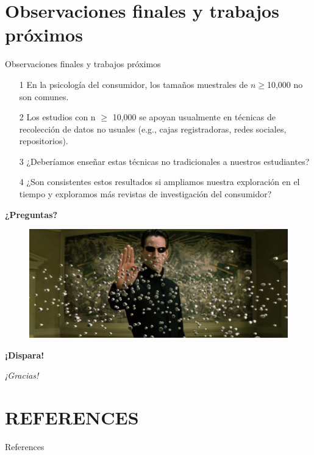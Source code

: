 \documentclass{beamer}
\begin{document}
\section{Observaciones finales y trabajos próximos}
\begin{frame}{Observaciones finales y trabajos próximos}
\begin{itemize}
    \item[1] En la psicología del consumidor, los tamaños muestrales de $n \geq$10,000 no son comunes.
    \pause
    \vspace{0.5 cm}
    \item[2] Los estudios con n $\geq$ 10,000 se apoyan usualmente en técnicas de recolección de datos no usuales (e.g., cajas registradoras, redes sociales, repositorios).
    \pause
    \vspace{0.5 cm}
    \item[3] ¿Deberíamos enseñar estas técnicas no tradicionales a nuestros estudiantes?
    \pause
    \vspace{0.5 cm}
    \item[4] ¿Son consistentes estos resultados si ampliamos nuestra exploración en el tiempo y exploramos más revistas de investigación del consumidor?

\end{itemize}
\end{frame}

\begin{frame}
\centering
\textbf{¿Preguntas?}
\begin{figure}
\centering
 \includegraphics[width=1\textwidth]{Neo}
\end{figure}
\textbf{¡Dispara!}
\end{frame}

\begin{frame}
    \centering
    \Huge
    \textit{¡Gracias!}
\end{frame}


\section*{REFERENCES}
\begin{frame}[allowframebreaks]{References}
\tiny{ 

} 
\end{frame}
\end{document}
